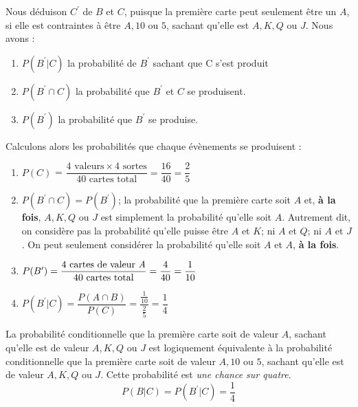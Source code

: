 \documentclass[8pt]{report}
\newcommand{\varitem}[3][black]{%
  \item[%
   \colorbox{#2}{\textcolor{#1}{\makebox(5.5,7){#3}}}%
  ]
}
\begin{document}
        \vspace{1em}
        \noindent Nous déduison $C^{\prime}$ de $B$ et $C$, puisque la première carte peut seulement être un $A$, si 
        elle est contraintes à être $A, 10$ ou $5$, sachant qu'elle est $A, K, Q$ ou $J$. Nous avons : 


        \begin{enumerate}
            \varitem{blue!40}{\textcolor{white}{$1$}} $P(B^{\prime}|C)$ la probabilité de $B^{\prime}$ 
            sachant que C s'est produit 
            \varitem{blue!40}{\textcolor{white}{$2$}} $P(B^{\prime}\cap C)$ la probabilité que $B^{\prime}$ 
            et $C$ se produisent.
            \varitem{blue!40}{\textcolor{white}{$3$}} $P(B^{\prime})$ la probabilité que $B^{\prime}$ se produise. 
        \end{enumerate} 
        \vspace{1em}
        \noindent Calculons alors les probabilités que chaque évènements se produisent : 
        \begin{enumerate}
            \item $P(C)$ = $\dfrac{4 \text{ valeurs} \times 4 \text{ sortes}}{40 \text{ cartes total}} = 
                \dfrac{16}{40} = \dfrac{2}{5}$
            \item $P( B^{\prime} \cap C) = P(B^{\prime})$; la probabilité que la première carte soit $A$ et, 
                \textbf{à la fois}, $A, K, Q$ ou $J$ est simplement la probabilité qu'elle soit $A$. Autrement dit, 
                on considère pas la probabilité qu'elle puisse être $A$ et $K$; ni $A$ et $Q$; ni $A$ et $J$. On peut 
                seulement considérer la probabilité qu'elle soit $A$ et $A$, \textbf{à la fois}.
            \item $P(B^{\prime}) = \dfrac{4 \text{ cartes de valeur \textit{A}}}{40 \text{ cartes total}} 
                = \dfrac{4}{40} = \dfrac{1}{10}$
            \item $P(B^{\prime}|C) = \dfrac{P(A\cap B)}{P(C)} = \dfrac{\frac{1}{10}}{\frac{2}{5}} = \dfrac{1}{4}$
        \end{enumerate}

        \begin{Reponse}{}{}
            La probabilité conditionnelle que la première carte soit de valeur $A$, sachant qu'elle est de valeur $A, K, Q$ ou $J$ 
            est logiquement équivalente à la probabilité conditionnelle que la première carte soit de valeur  $A, 10$ ou $5$, sachant
            qu'elle est de valeur $A, K, Q$ ou $J$. Cette probabilité est \textit{une chance sur quatre}. 
            \[ P(B|C) = P(B^{\prime}| C) = \dfrac{1}{4} \]
        \end{Reponse}
\end{document}
